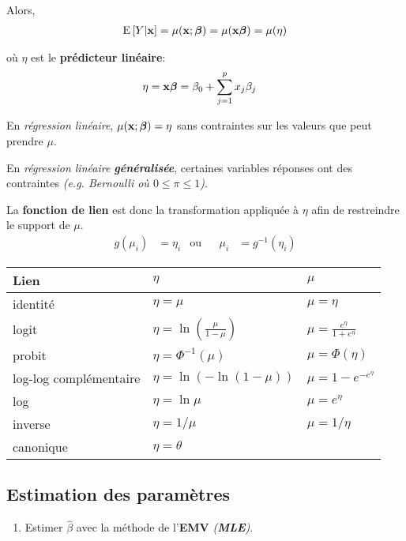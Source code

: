 \documentclass[10pt, french]{article}
\begin{document}
\begin{multicols*}{3}
Alors, 
\begin{align*}
	\mathrm{E} \left[ Y | \mathbf{x} \right] 
		= \mu(\mathbf{x}; \bm{\beta}) 
		= \mu(\mathbf{x}\bm{\beta}) 
		= \mu(\eta)
\end{align*}

où $\eta$ est le \textbf{prédicteur linéaire}: 
\begin{align*}
	\eta 
		&=	\mathbf{x} \boldsymbol{\beta}	
		=	\beta_0 + \sum_{j = 1}^{p} x_{j} \beta_{j}	
\end{align*}

En \textit{régression linéaire}, $\mu(\mathbf{x}; \bm{\beta}) = \eta$ sans contraintes sur les valeurs que peut prendre $\mu$.

En \textit{régression linéaire \textbf{généralisée}}, certaines variables réponses ont des contraintes \textit{(e.g.  Bernoulli où $0 \leq \pi \leq 1$)}.

La \textbf{fonction de lien} est donc la transformation appliquée à $\eta$ afin de restreindre le support de $\mu$.
\begin{align*}
	g(\mu_i) 
		&= \eta_i	&	\text{ou} & 
	&\mu_i
		&= g^{-1}(\eta_i)
\end{align*}

\begin{center}
\begin{tabular}{| p{2cm} | l l |}
\hline
	\textbf{Lien}			&	$\eta$ &	$\mu$	\\\hline
	identité		&	$\eta = \mu$	 &	$\mu = \eta$	  	\\
	logit	&	$\eta = \ln \left( \frac{\mu}{1 - \mu} \right)$	&	$\mu = \frac{e^{\eta}}{1 + e^{\eta}}$	\\
	probit		&	$\eta = \Phi^{-1}(\mu)$	&	$\mu = \Phi(\eta)$	\\
	log-log complémentaire &	$\eta = \ln ( - \ln (1 - \mu))$	&	$\mu = 1 - e^{-e^{\eta}}$	\\
	log			&	$\eta = \ln \mu$	&	$\mu = e^{\eta}$	\\
	inverse			&	$\eta = 1/\mu$	&	$\mu = 1/\eta$	\\
	canonique	&	$\eta = \theta$	&	 	\\
\hline
\end{tabular}
\end{center}

\subsection*{Estimation des paramètres}

\begin{enumerate}[label=\faAngleRight]
	\item	Estimer $\hat{\beta}$ avec la méthode de l'\textbf{EMV} \textit{(\textbf{MLE})}.
	

\end{enumerate}
\end{multicols*}
\end{document}
